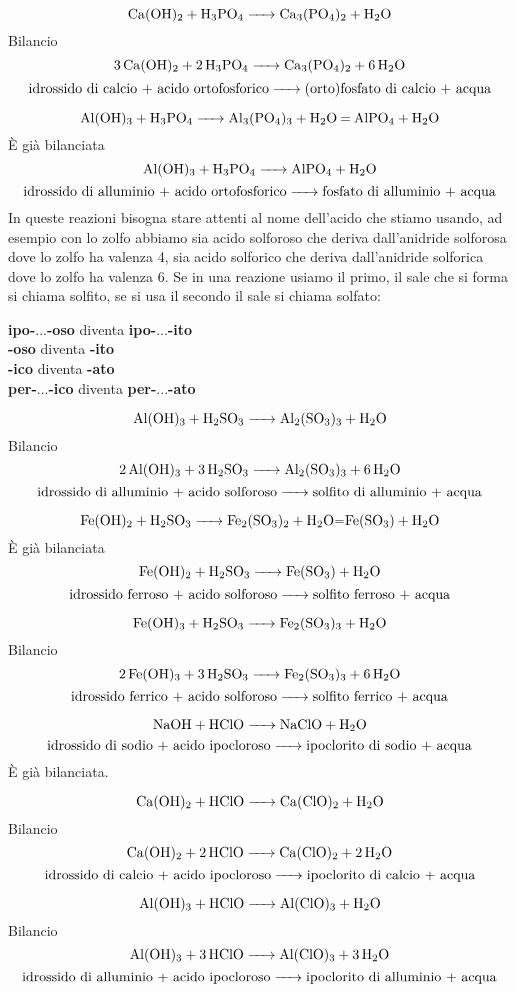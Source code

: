 $$\ce{Ca(OH)_2 + H_3PO_4 -> Ca_3(PO_4)_2 + H_2O}$$Bilancio
$$\ce{3 Ca(OH)_2 + 2 H_3PO_4 -> Ca_3(PO_4)_2 + 6 H_2O}$$
$$\text{idrossido di calcio + acido ortofosforico} \ce{->} \text{(orto)fosfato di calcio + acqua}$$

$$\ce{Al(OH)_3 + H_3PO_4 -> Al_3(PO_4)_3 + H_2O = AlPO_4 + H_2O}$$È già bilanciata
$$\ce{Al(OH)_3 + H_3PO_4 -> AlPO_4 + H_2O}$$
$$\text{idrossido di alluminio + acido ortofosforico} \ce{->} \text{fosfato di alluminio + acqua}$$
In queste reazioni bisogna stare attenti al nome dell'acido che stiamo usando, ad esempio con lo zolfo abbiamo sia acido solforoso  che deriva dall'anidride solforosa  dove lo zolfo ha valenza 4, sia acido solforico  che deriva dall'anidride solforica  dove lo zolfo ha valenza 6. Se in una reazione usiamo il primo, il sale che si forma si chiama solfito, se si usa il secondo il sale si chiama solfato:
\begin{center}
\textbf{ipo-}...\textbf{-oso} diventa \textbf{ipo-}...\textbf{-ito}\\
\textbf{-oso} diventa \textbf{-ito}\\
\textbf{-ico} diventa \textbf{-ato}\\
\textbf{per-}...\textbf{-ico} diventa \textbf{per-}...\textbf{-ato}
\end{center}

$$\ce{Al(OH)_3 + H_2SO_3 -> Al_2(SO_3)_3 + H_2O}$$Bilancio
$$\ce{2 Al(OH)_3 + 3 H_2SO_3 -> Al_2(SO_3)_3 + 6 H_2O}$$
$$\text{idrossido di alluminio + acido solforoso} \ce{->} \text{solfito di alluminio + acqua}$$

$$\ce{Fe(OH)_2 + H_2SO_3 -> Fe_2(SO_3)_2 + H_2O=Fe(SO_3) + H_2O}$$È già bilanciata
$$\ce{Fe(OH)_2 + H_2SO_3 -> Fe(SO_3) + H_2O}$$
$$\text{idrossido ferroso + acido solforoso} \ce{->} \text{solfito ferroso + acqua}$$

$$\ce{Fe(OH)_3 + H_2SO_3 -> Fe_2(SO_3)_3 + H_2O}$$Bilancio
$$\ce{2 Fe(OH)_3 + 3 H_2SO_3 -> Fe_2(SO_3)_3 + 6 H_2O}$$
$$\text{idrossido ferrico + acido solforoso} \ce{->} \text{solfito ferrico + acqua}$$

$$\ce{NaOH + HClO -> NaClO + H_2O}$$
$$\text{idrossido di sodio + acido ipocloroso}\ce{->}\text{ipoclorito di sodio + acqua}$$
È già bilanciata.

$$\ce{Ca(OH)_2 + HClO -> Ca(ClO)_2 + H_2O}$$Bilancio
$$\ce{Ca(OH)_2 + 2 HClO -> Ca(ClO)_2 + 2 H_2O}$$
$$\text{idrossido di calcio + acido ipocloroso}\ce{->}\text{ipoclorito di calcio + acqua}$$

$$\ce{Al(OH)_3 + HClO -> Al(ClO)_3 + H_2O}$$Bilancio
$$\ce{Al(OH)_3 + 3HClO -> Al(ClO)_3 + 3H_2O}$$
$$\text{idrossido di alluminio + acido ipocloroso}\ce{->}\text{ipoclorito di alluminio + acqua}$$

